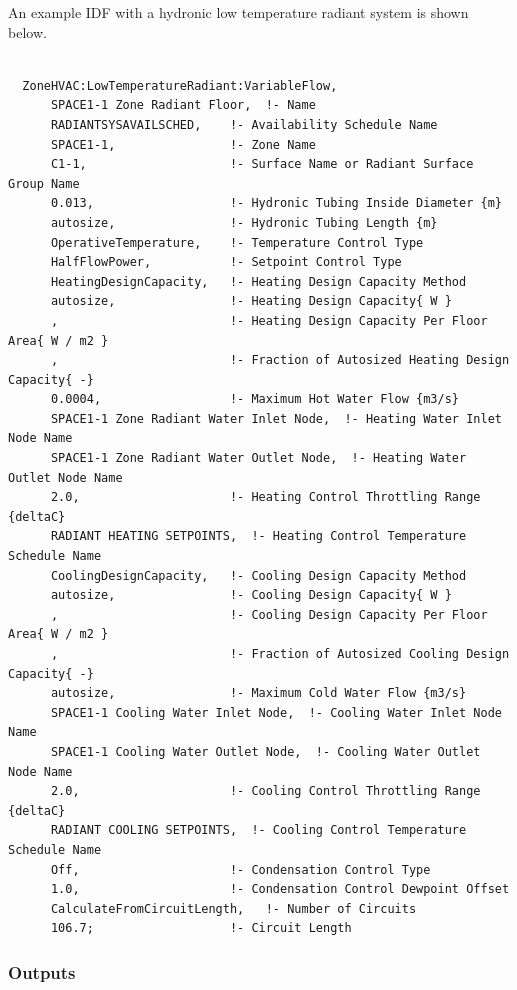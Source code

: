 An example IDF with a hydronic low temperature radiant system is shown below.

\begin{lstlisting}

  ZoneHVAC:LowTemperatureRadiant:VariableFlow,
      SPACE1-1 Zone Radiant Floor,  !- Name
      RADIANTSYSAVAILSCHED,    !- Availability Schedule Name
      SPACE1-1,                !- Zone Name
      C1-1,                    !- Surface Name or Radiant Surface Group Name
      0.013,                   !- Hydronic Tubing Inside Diameter {m}
      autosize,                !- Hydronic Tubing Length {m}
      OperativeTemperature,    !- Temperature Control Type
      HalfFlowPower,           !- Setpoint Control Type
      HeatingDesignCapacity,   !- Heating Design Capacity Method
      autosize,                !- Heating Design Capacity{ W }
      ,                        !- Heating Design Capacity Per Floor Area{ W / m2 }
      ,                        !- Fraction of Autosized Heating Design Capacity{ -}
      0.0004,                  !- Maximum Hot Water Flow {m3/s}
      SPACE1-1 Zone Radiant Water Inlet Node,  !- Heating Water Inlet Node Name
      SPACE1-1 Zone Radiant Water Outlet Node,  !- Heating Water Outlet Node Name
      2.0,                     !- Heating Control Throttling Range {deltaC}
      RADIANT HEATING SETPOINTS,  !- Heating Control Temperature Schedule Name
      CoolingDesignCapacity,   !- Cooling Design Capacity Method
      autosize,                !- Cooling Design Capacity{ W }
      ,                        !- Cooling Design Capacity Per Floor Area{ W / m2 }
      ,                        !- Fraction of Autosized Cooling Design Capacity{ -}
      autosize,                !- Maximum Cold Water Flow {m3/s}
      SPACE1-1 Cooling Water Inlet Node,  !- Cooling Water Inlet Node Name
      SPACE1-1 Cooling Water Outlet Node,  !- Cooling Water Outlet Node Name
      2.0,                     !- Cooling Control Throttling Range {deltaC}
      RADIANT COOLING SETPOINTS,  !- Cooling Control Temperature Schedule Name
      Off,                     !- Condensation Control Type
      1.0,                     !- Condensation Control Dewpoint Offset
      CalculateFromCircuitLength,   !- Number of Circuits
      106.7;                   !- Circuit Length
\end{lstlisting}

\subsubsection{Outputs}\label{outputs-5-007}

